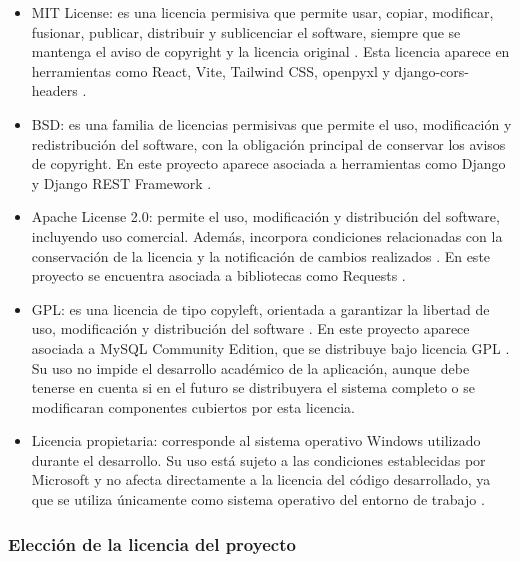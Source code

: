 \begin{itemize}
	\item MIT License: es una licencia permisiva que permite usar, copiar, modificar, fusionar, publicar, distribuir y sublicenciar el software, siempre que se mantenga el aviso de copyright y la licencia original \cite{mitLicense}. Esta licencia aparece en herramientas como React, Vite, Tailwind CSS, openpyxl y django-cors-headers \cite{reactLicense,viteLicense,tailwindLicense,openpyxlLicense,corsHeadersLicense}.
	
	\item BSD: es una familia de licencias permisivas que permite el uso, modificación y redistribución del software, con la obligación principal de conservar los avisos de copyright. En este proyecto aparece asociada a herramientas como Django y Django REST Framework \cite{djangoLicense,drfLicense}.
	
	\item Apache License 2.0: permite el uso, modificación y distribución del software, incluyendo uso comercial. Además, incorpora condiciones relacionadas con la conservación de la licencia y la notificación de cambios realizados \cite{apacheLicense}. En este proyecto se encuentra asociada a bibliotecas como Requests \cite{requestsLicense}.
	
	\item GPL: es una licencia de tipo copyleft, orientada a garantizar la libertad de uso, modificación y distribución del software \cite{gplLicense}. En este proyecto aparece asociada a MySQL Community Edition, que se distribuye bajo licencia GPL \cite{mysqlLicense}. Su uso no impide el desarrollo académico de la aplicación, aunque debe tenerse en cuenta si en el futuro se distribuyera el sistema completo o se modificaran componentes cubiertos por esta licencia.
	
	\item Licencia propietaria: corresponde al sistema operativo Windows utilizado durante el desarrollo. Su uso está sujeto a las condiciones establecidas por Microsoft y no afecta directamente a la licencia del código desarrollado, ya que se utiliza únicamente como sistema operativo del entorno de trabajo \cite{windowsLicense}.
	
\end{itemize}

\subsubsection{Elección de la licencia del proyecto}

